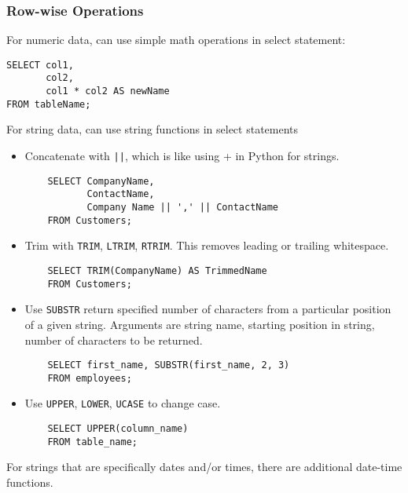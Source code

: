 \documentclass[12pt]{article}
\theoremstyle{plain}
\theoremstyle{definition}
\theoremstyle{remark}
\begin{document}
\clearpage
\subsubsection{Row-wise Operations}

For numeric data, can use simple math operations in select statement:
\begin{lstlisting}
SELECT col1,
       col2,
       col1 * col2 AS newName
FROM tableName;
\end{lstlisting}
For string data, can use string functions in select statements
\begin{itemize}
  \item
    Concatenate with \texttt{||}, which is like using + in Python for
    strings.
    \begin{lstlisting}
    SELECT CompanyName,
           ContactName,
           Company Name || ',' || ContactName
    FROM Customers;
    \end{lstlisting}

  \item
    Trim with \texttt{TRIM}, \texttt{LTRIM}, \texttt{RTRIM}.
    This removes leading or trailing whitespace.
    \begin{lstlisting}
    SELECT TRIM(CompanyName) AS TrimmedName
    FROM Customers;
    \end{lstlisting}

  \item
    Use \texttt{SUBSTR} return specified number of characters from a
    particular position of a given string.
    Arguments are string name, starting position in string, number of
    characters to be returned.
    \begin{lstlisting}
    SELECT first_name, SUBSTR(first_name, 2, 3)
    FROM employees;
    \end{lstlisting}

  \item
    Use \texttt{UPPER}, \texttt{LOWER}, \texttt{UCASE} to change case.
    \begin{lstlisting}
    SELECT UPPER(column_name)
    FROM table_name;
    \end{lstlisting}
\end{itemize}
For strings that are specifically dates and/or times, there are
additional date-time functions.
\end{document}
